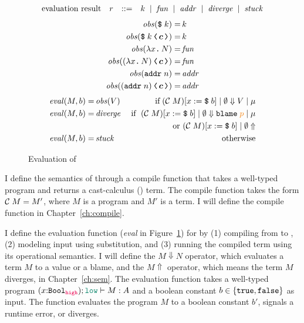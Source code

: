 {\color{NavyBlue}   %

  \begin{figure}[tbp]
    \raggedright
        \[
          \begin{array}{rcll}
            \text{evaluation result}     & r & ::=  & k \;\mid\; \mathit{fun} \;\mid\; \mathit{addr} \;\mid\; \mathit{diverge} \;\mid\; \mathit{stuck}
          \end{array}
        \]
        \begin{align*}
          \mathit{obs}(\ccconst{k}) =&\, k \\
          \mathit{obs}(\cccast{\ccconst{k}}{\bm{c}}) =&\, k \\
          \mathit{obs}(\cclam{x}{N}) =&\, \mathit{fun} \\
          \mathit{obs}(\cccast{(\cclam{x}{N})}{\bm{c}}) =&\, \mathit{fun} \\
          \mathit{obs}(\ccaddr{n}) =&\, \mathit{addr} \\
          \mathit{obs}(\cccast{(\ccaddr{n})}{\bm{c}}) =&\, \mathit{addr}
        \end{align*}
        \begin{align*}
          \mathit{eval}(M, b) =&\, \mathit{obs}(V)\;&\text{if}\;(\compile{M})[x:=\ccconst{b}] \mid \emptyset \Downarrow V \mid \mu \\
          \mathit{eval}(M, b) =&\, \mathit{diverge} \;&\text{if~}\;(\compile{M})[x:=\ccconst{b}] \mid \emptyset \Downarrow \blame{\bl{p}} \mid \mu \\
                                                    & &\text{or}~ (\compile{M})[x:=\ccconst{b}] \mid \emptyset \Uparrow \\
          \mathit{eval}(M, b) =&\, \mathit{stuck}\;&\text{otherwise}
        \end{align*}
        \caption{Evaluation of \Surface}
        \label{fig:eval}
  \end{figure}

I define the semantics of \Surface through a compile function that takes a
well-typed \Surface program and returns a cast-calculus (\CC) term. The compile
function takes the form $\mathcal{C}\;{M} = M'$, where $M$ is a \Surface program and
$M'$ is a \CC term. I will define the compile function in
Chapter~\ref{ch:compile}.

I define the evaluation function (\textit{eval} in Figure~\ref{fig:eval}) for
\Surface by (1) compiling from \Surface to \CC, (2) modeling input using
substitution, and (3) running the compiled \CC term using its operational
semantics. I will define the $M \Downarrow N$ operator, which evaluates a \CC
term $M$ to a value or a blame, and the $M \Uparrow$ operator, which means the
\CC term $M$ diverges, in Chapter~\ref{ch:sem}. The evaluation function takes a
well-typed \Surface program $(x{:}\Bool_{\high}) ; \low \vdash M : A$
and a boolean constant $b \in \{\mathtt{true}, \mathtt{false}\}$ as input. The function
evaluates the program $M$ to a boolean constant $b'$, signals a runtime error,
or diverges.

}  %

